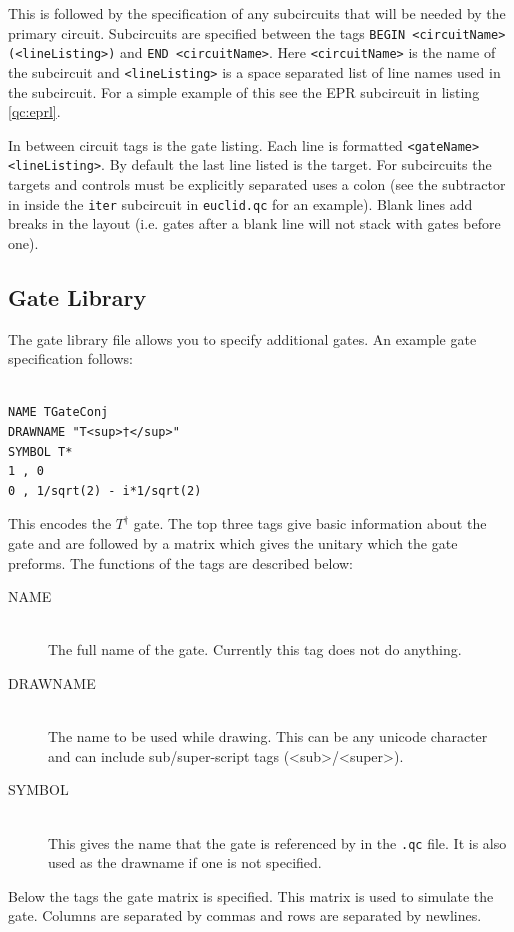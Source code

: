 \documentclass[10pt]{article}
\theoremstyle{definition}
\begin{document}
This is followed by the specification of any subcircuits that will be needed by the primary circuit.
Subcircuits are specified between the tags \verb+BEGIN <circuitName> (<lineListing>)+ and
\verb+END <circuitName>+. Here \verb+<circuitName>+ is the name of the subcircuit 
and \verb+<lineListing>+ is a space separated list of line names
used in the subcircuit. For a simple example of this see the EPR subcircuit in listing \ref{qc:eprl}.

In between circuit tags is the gate listing.  Each line is formatted \verb+<gateName> <lineListing>+.
By default the last line listed is the target.  For subcircuits the targets and controls must be explicitly 
separated uses a colon (see the subtractor in inside the \verb+iter+ subcircuit in \verb+euclid.qc+ for an example).
Blank lines add breaks in the layout (i.e. gates after a blank line will not stack with gates before one).

\subsection{Gate Library}
The gate library file allows you to specify additional gates.  An example gate specification follows:

\small
\begin{verbatim}

NAME TGateConj
DRAWNAME "T<sup>†</sup>"
SYMBOL T*
1 , 0
0 , 1/sqrt(2) - i*1/sqrt(2)

\end{verbatim}
\normalsize

This encodes the $T^\dagger$ gate. The top three tags give basic information about the gate and 
are followed by a matrix which gives the unitary which the gate preforms.  The functions of the 
tags are described below:
\begin{description}
\item[NAME] \hfill \\
The full name of the gate.  Currently this tag does not do anything.
\item[DRAWNAME] \hfill \\
The name to be used while drawing.  This can be any unicode character 
and can include sub/super-script tags (<sub>/<super>).
\item[SYMBOL] \hfill \\
This gives the name that the gate is referenced by in the \verb+.qc+ file.  It is also used as the drawname if one is not
specified.
\end{description}
Below the tags the gate matrix is specified.  This matrix is used to simulate the gate.  Columns are separated by commas
and rows are separated by newlines.
\end{document}
